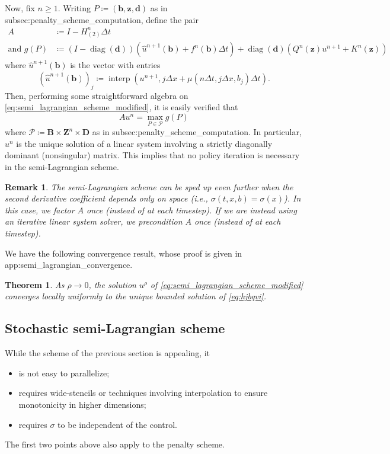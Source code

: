 \documentclass[12pt]{article}
\newcounter{dummy}
\newtheorem{rem}[dummy]{Remark}
\newtheorem{theorem}[dummy]{Theorem}
\begin{document}
Now, fix $n{\geqslant}1$. Writing $P\coloneqq(\boldsymbol{b},\boldsymbol{z},\boldsymbol{d})$
as in {\prettyref}{subsec:penalty_scheme_computation}, define the 
pair
\begin{align*}
A & \coloneqq I-H_{(2)}^{n}\Delta t\\
\text{and }g(P) & \coloneqq(I-{\operatorname{diag}}(\boldsymbol{d}))(\hat{u}^{n+1}(\boldsymbol{b})+f^{n}(\boldsymbol{b})\Delta t)+{\operatorname{diag}}(\boldsymbol{d})(Q^{n}(\boldsymbol{z})u^{n+1}+K^{n}(\boldsymbol{z}))
\end{align*}
where $\hat{u}^{n+1}(\boldsymbol{b})$ is the vector with entries
\[
(\hat{u}^{n+1}(\boldsymbol{b}))_{j}\coloneqq{\operatorname{interp}}(u^{n+1},j\Delta x+\mu(n\Delta t,j\Delta x,b_{j})\Delta t).
\]
Then, performing some straightforward algebra on \eqref{eq:semi_lagrangian_scheme_modified},
it is easily verified that
\[
Au^{n}=\max_{P\in\mathcal{P}}g(P)
\]
where $\mathcal{P}\coloneqq\boldsymbol{B}\times\boldsymbol{Z}^{n}\times\boldsymbol{D}$
as in {\prettyref}{subsec:penalty_scheme_computation}. In particular,
$u^{n}$ is the unique solution of a linear system involving a strictly
diagonally dominant (nonsingular) matrix. This implies that
no policy iteration is necessary in the semi-Lagrangian scheme.

\begin{rem}The semi-Lagrangian scheme can be sped up even further
when the second derivative coefficient depends only on space
(i.e., $\sigma(t,x,b)=\sigma(x)$). In this case, we factor
$A$ once (instead of at each timestep). If we are instead using an
iterative linear system solver, we precondition $A$ once (instead
of at each timestep).\end{rem}

We have the following convergence result, whose proof is given
in {\prettyref}{app:semi_lagrangian_convergence}.
\begin{theorem}
\label{thm:semi_lagrangian_convergence}As $\rho\rightarrow0$, the
solution $u^{\rho}$ of \eqref{eq:semi_lagrangian_scheme_modified}
converges locally uniformly to the unique bounded solution of \eqref{eq:hjbqvi}.
\end{theorem}

\subsection{\label{subsec:stochastic_semi_lagrangian_scheme}Stochastic semi-Lagrangian
scheme}

While the scheme of the previous section is appealing, it
\begin{itemize}
\item is not easy to parallelize;
\item requires wide-stencils \cite{MR2399429} or techniques involving interpolation
\cite{MR3042570} to ensure monotonicity in higher dimensions;
\item requires $\sigma$ to be independent of the control.
\end{itemize}
The first two points above also apply to the penalty scheme.
\end{document}
